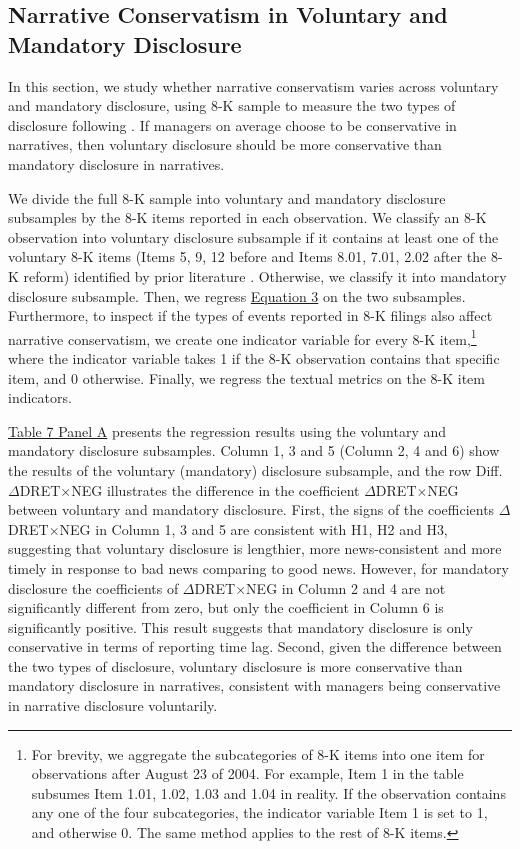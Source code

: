 \documentclass[a4paper]{article}
\begin{document}
\begin{spacing}{2}
\subsection{Narrative Conservatism in Voluntary and Mandatory Disclosure}
In this section, we study whether narrative conservatism varies across voluntary and mandatory disclosure, using 8-K sample to measure the two types of disclosure following . If managers on average choose to be conservative in narratives, then voluntary disclosure should be more conservative than mandatory disclosure in narratives. 

We divide the full 8-K sample into voluntary and mandatory disclosure subsamples by the 8-K items reported in each observation. We classify an 8-K observation into voluntary disclosure subsample if it contains at least one of the voluntary 8-K items (Items 5, 9, 12 before and Items 8.01, 7.01, 2.02 after the 8-K reform) identified by prior literature \cite{lermanNewForm8K2010, heMeasuringDisclosureUsing2020}. Otherwise, we classify it into mandatory disclosure subsample. Then, we regress \hyperref[eq3]{Equation 3} on the two subsamples. Furthermore, to inspect if the types of events reported in 8-K filings also affect narrative conservatism, we create one indicator variable for every 8-K item,\footnote{For brevity, we aggregate the subcategories of 8-K items into one item for observations after August 23 of 2004. For example, Item 1 in the table subsumes Item 1.01, 1.02, 1.03 and 1.04 in reality. If the observation contains any one of the four subcategories, the indicator variable Item 1 is set to 1, and otherwise 0. The same method applies to the rest of 8-K items.} where the indicator variable takes 1 if the 8-K observation contains that specific item, and 0 otherwise. Finally, we regress the textual metrics on the 8-K item indicators.

\hyperref[T7PA]{Table 7 Panel A} presents the regression results using the voluntary and mandatory disclosure subsamples. Column 1, 3 and 5 (Column 2, 4 and 6) show the results of the voluntary (mandatory) disclosure subsample, and the row Diff. $\Delta$DRET$\times$NEG illustrates the difference in the coefficient $\Delta$DRET$\times$NEG between voluntary and mandatory disclosure. First, the signs of the coefficients $\Delta$DRET$\times$NEG in Column 1, 3 and 5 are consistent with H1, H2 and H3, suggesting that voluntary disclosure is lengthier, more news-consistent and more timely in response to bad news comparing to good news. However, for mandatory disclosure the coefficients of $\Delta$DRET$\times$NEG in Column 2 and 4 are not significantly different from zero, but only the coefficient in Column 6 is significantly positive. This result suggests that mandatory disclosure is only conservative in terms of reporting time lag. Second, given the difference between the two types of disclosure, voluntary disclosure is more conservative than mandatory disclosure in narratives, consistent with managers being conservative in narrative disclosure voluntarily.


\end{spacing}
\end{document}
